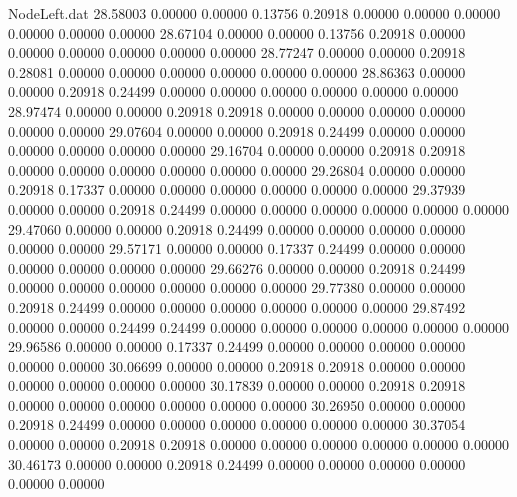 \begin{filecontents}{NodeLeft.dat}
  28.58003    0.00000    0.00000     0.13756    0.20918    0.00000    0.00000    0.00000    0.00000    0.00000    0.00000
  28.67104    0.00000    0.00000     0.13756    0.20918    0.00000    0.00000    0.00000    0.00000    0.00000    0.00000
  28.77247    0.00000    0.00000     0.20918    0.28081    0.00000    0.00000    0.00000    0.00000    0.00000    0.00000
  28.86363    0.00000    0.00000     0.20918    0.24499    0.00000    0.00000    0.00000    0.00000    0.00000    0.00000
  28.97474    0.00000    0.00000     0.20918    0.20918    0.00000    0.00000    0.00000    0.00000    0.00000    0.00000
  29.07604    0.00000    0.00000     0.20918    0.24499    0.00000    0.00000    0.00000    0.00000    0.00000    0.00000
  29.16704    0.00000    0.00000     0.20918    0.20918    0.00000    0.00000    0.00000    0.00000    0.00000    0.00000
  29.26804    0.00000    0.00000     0.20918    0.17337    0.00000    0.00000    0.00000    0.00000    0.00000    0.00000
  29.37939    0.00000    0.00000     0.20918    0.24499    0.00000    0.00000    0.00000    0.00000    0.00000    0.00000
  29.47060    0.00000    0.00000     0.20918    0.24499    0.00000    0.00000    0.00000    0.00000    0.00000    0.00000
  29.57171    0.00000    0.00000     0.17337    0.24499    0.00000    0.00000    0.00000    0.00000    0.00000    0.00000
  29.66276    0.00000    0.00000     0.20918    0.24499    0.00000    0.00000    0.00000    0.00000    0.00000    0.00000
  29.77380    0.00000    0.00000     0.20918    0.24499    0.00000    0.00000    0.00000    0.00000    0.00000    0.00000
  29.87492    0.00000    0.00000     0.24499    0.24499    0.00000    0.00000    0.00000    0.00000    0.00000    0.00000
  29.96586    0.00000    0.00000     0.17337    0.24499    0.00000    0.00000    0.00000    0.00000    0.00000    0.00000
  30.06699    0.00000    0.00000     0.20918    0.20918    0.00000    0.00000    0.00000    0.00000    0.00000    0.00000
  30.17839    0.00000    0.00000     0.20918    0.20918    0.00000    0.00000    0.00000    0.00000    0.00000    0.00000
  30.26950    0.00000    0.00000     0.20918    0.24499    0.00000    0.00000    0.00000    0.00000    0.00000    0.00000
  30.37054    0.00000    0.00000     0.20918    0.20918    0.00000    0.00000    0.00000    0.00000    0.00000    0.00000
  30.46173    0.00000    0.00000     0.20918    0.24499    0.00000    0.00000    0.00000    0.00000    0.00000    0.00000
\end{filecontents}
